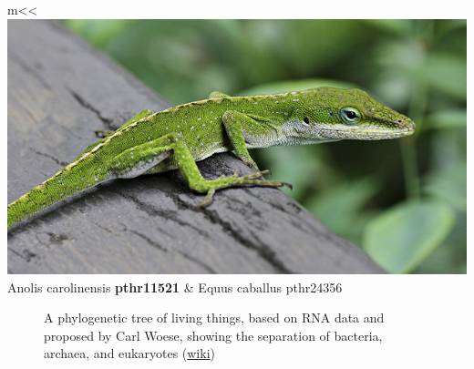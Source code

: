\documentclass[aspectratio=169, 9pt]{beamer}\usepackage[]{graphicx}\usepackage[]{color}
\begin{document}
\begin{frame}[t]
\begin{table}
\begin{tabular}{*{2}{m{\tmpwidth}<\centering}}
\includegraphics[width=1\linewidth]{Anole_Lizard.jpg} \linebreak Anolis carolinensis \textbf{pthr11521} & %
   \linebreak Equus caballus pthr24356
\end{tabular}
\end{table}

\end{frame}

\begin{frame}

\begin{figure}
\centering
{\footnotesize
\def\svgwidth{.7\linewidth}

}
\caption{A phylogenetic tree of living things, based on RNA data and proposed by Carl Woese, showing the separation of bacteria, archaea, and eukaryotes (\href{https://en.wikipedia.org/wiki/File:Phylogenetic_tree.svg}{wiki})}
\end{figure}
\end{frame}
\end{document}
